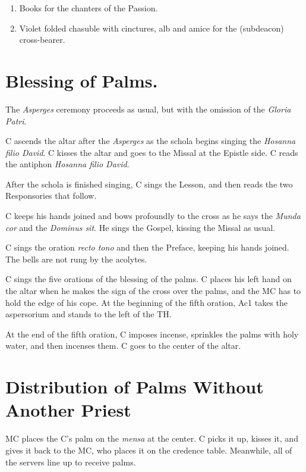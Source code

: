 {\begin{enumerate}[label=\Roman*.]
\begin{enumerate}[label=\arabic*.]
				\item Books for the chanters of the Passion.

				\item Violet folded chasuble with cinctures, alb and amice for
					the (subdeacon) cross-bearer.

			\end{enumerate}

	\end{enumerate}

	\section{Blessing of Palms.}

	\rubric The \textit{Asperges} ceremony proceeds as usual, but with the
	omission of the \textit{Gloria Patri}.

	\rubric C ascends the altar after the \textit{Asperges} as the schola begins
	singing the \textit{Hosanna filio David}. C kisses the altar and goes to
	the Missal at the Epistle side. C reads the antiphon \textit{Hosanna filio
	David}.

	\rubric After the schola is finished singing, C sings the Lesson, and then
	reads the two Responsories that follow.

	\rubric C keeps his hands joined and bows profoundly to the cross as he
	says the \textit{Munda cor} and the \textit{Dominus sit}. He sings the
	Gospel, kissing the Missal as usual.

	\rubric C sings the oration \textit{recto tono} and then the Preface,
	keeping his hands joined. The bells are not rung by the acolytes.

	\rubric C sings the five orations of the blessing of the palms. C places
	his left hand on the altar when he makes the sign of the cross over the
	palms, and the MC has to hold the edge of his cope. At the beginning of the
	fifth oration, Ac1 takes the aspersorium and stands to the left of the TH.

	\rubric At the end of the fifth oration, C imposes incense, sprinkles the
	palms with holy water, and then incenses them. C goes to the center of the
	altar.

	\section{Distribution of Palms Without Another Priest}

	\rubric MC places the C's palm on the \textit{mensa} at the center. C picks
	it up, kisses it, and gives it back to the MC, who places it on the
	credence table. Meanwhile, all of the servers line up to receive palms.

}
